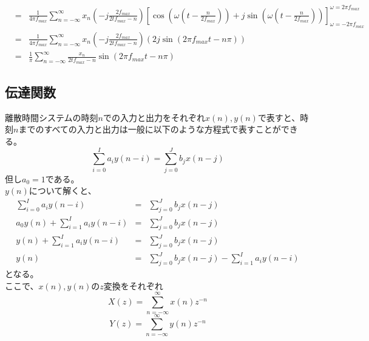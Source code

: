\documentclass[a4paper]{jsarticle}
\begin{document}
\begin{eqnarray}
	& = & \frac { 1 } { 4 \pi f_{max} } \sum _{ n = - \infty } ^\infty x_n \left( -j \frac { 2 f_{max} } { 2tf_{max} - n } \right) \left[ \cos \left( \omega \left( t - \frac { n } { 2 f_{max} } \right) \right) + j \sin \left( \omega \left( t - \frac { n } { 2 f_{max} } \right) \right) \right] _{ \omega = -2 \pi f_{max} } ^{ \omega = 2 \pi f_{max} } \nonumber \\
	& = & \frac { 1 } { 4 \pi f_{max} } \sum _{ n = - \infty } ^\infty x_n \left( -j \frac { 2 f_{max} } { 2tf_{max} - n } \right) \left( 2 j \sin \left( 2 \pi f_{max} t - n \pi \right) \right) \nonumber \\
	& = & \frac { 1 } { \pi } \sum _{ n = - \infty } ^\infty \frac { x_n } { 2tf_{max} - n } \sin \left( 2 \pi f_{max} t - n \pi \right)
\end{eqnarray}
\subsection{伝達関数}
離散時間システムの時刻$n$での入力と出力をそれぞれ$ x \left( n \right) , y \left( n \right) $で表すと、時刻$n$までのすべての入力と出力は一般に以下のような方程式で表すことができる。
\begin{equation}
\label{DiscreteTimeSystem}
\sum _{ i = 0} ^I a_i y \left( n - i \right) = \sum _{ j = 0} ^J b_j x \left( n - j \right)
\end{equation}
但し$ a_0 = 1 $である。\\
$ y \left( n \right) $について解くと、
\begin{eqnarray}
	\sum _{ i = 0} ^I a_i y \left( n - i \right) & = & \sum _{ j = 0} ^J b_j x \left( n - j \right) \nonumber \\
	a_0 y \left( n \right) + \sum _{ i = 1} ^I a_i y \left( n - i \right) & = & \sum _{ j = 0} ^J b_j x \left( n - j \right) \nonumber \\
	y \left( n \right) + \sum _{ i = 1} ^I a_i y \left( n - i \right) & = & \sum _{ j = 0} ^J b_j x \left( n - j \right) \nonumber \\
	y \left( n \right) & = & \sum _{ j = 0} ^J b_j x \left( n - j \right) - \sum _{ i = 1} ^I a_i y \left( n - i \right)
\end{eqnarray}
となる。\\
ここで、$ x \left( n \right) , y \left( n \right) $の$z$変換をそれぞれ
\begin{equation}
X \left( z \right) = \sum _{ n = - \infty } ^\infty x \left( n \right) z ^{ -n }
\end{equation}
\begin{equation}
Y \left( z \right) = \sum _{ n = - \infty } ^\infty y \left( n \right) z ^{ -n }
\end{equation}
\end{document}
